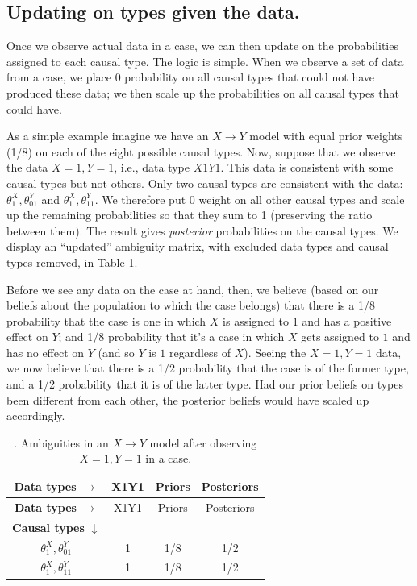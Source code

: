 \documentclass[
  12pt,
]{book}
\begin{document}
\hypertarget{updating-on-types-given-the-data.}{%
\subsection{Updating on types given the data.}\label{updating-on-types-given-the-data.}}

Once we observe actual data in a case, we can then update on the probabilities assigned to each causal type. The logic is simple. When we observe a set of data from a case, we place \(0\) probability on all causal types that could not have produced these data; we then scale up the probabilities on all causal types that could have.

As a simple example imagine we have an \(X\rightarrow Y\) model with equal prior weights (1/8) on each of the eight possible causal types. Now, suppose that we observe the data \(X=1, Y=1\), i.e., data type \(X1Y1\). This data is consistent with some causal types but not others. Only two causal types are consistent with the data: \(\theta^X_1, \theta^Y_{01}\) and \(\theta^X_1, \theta^Y_{11}\). We therefore put 0 weight on all other causal types and scale up the remaining probabilities so that they sum to 1 (preserving the ratio between them). The result gives \emph{posterior} probabilities on the causal types. We display an ``updated'' ambiguity matrix, with excluded data types and causal types removed, in Table \ref{tab:ambigupdate}.

Before we see any data on the case at hand, then, we believe (based on our beliefs about the population to which the case belongs) that there is a 1/8 probability that the case is one in which \(X\) is assigned to \(1\) and has a positive effect on \(Y\); and 1/8 probability that it's a case in which \(X\) gets assigned to \(1\) and has no effect on \(Y\) (and so \(Y\) is \(1\) regardless of \(X\)). Seeing the \(X=1, Y=1\) data, we now believe that there is a 1/2 probability that the case is of the former type, and a 1/2 probability that it is of the latter type. Had our prior beliefs on types been different from each other, the posterior beliefs would have scaled up accordingly.

\begin{longtable}[]{@{}cccc@{}}
\caption{\label{tab:ambigupdate}. Ambiguities in an \(X \rightarrow Y\) model after observing \(X=1, Y=1\) in a case.}\tabularnewline
\toprule
\textbf{Data types} \(\rightarrow\) & X1Y1 & Priors & Posteriors \\
\midrule
\endfirsthead
\toprule
\textbf{Data types} \(\rightarrow\) & X1Y1 & Priors & Posteriors \\
\midrule
\endhead
\textbf{Causal types} \(\downarrow\) & & & \\
\(\theta^X_1,\theta^Y_{01}\) & 1 & 1/8 & 1/2 \\
\(\theta^X_1,\theta^Y_{11}\) & 1 & 1/8 & 1/2 \\
\bottomrule
\end{longtable}
\end{document}
